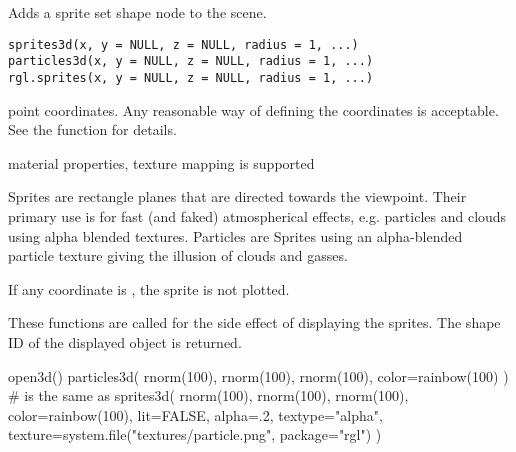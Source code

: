 \documentclass{article}
\begin{document}
\begin{Description}\relax
Adds a sprite set shape node to the scene.
\end{Description}
\begin{Usage}
\begin{verbatim}
sprites3d(x, y = NULL, z = NULL, radius = 1, ...)
particles3d(x, y = NULL, z = NULL, radius = 1, ...)
rgl.sprites(x, y = NULL, z = NULL, radius = 1, ...)
\end{verbatim}
\end{Usage}
\begin{Arguments}
\begin{ldescription}
\item[\code{ x, y, z }] point coordinates.  Any reasonable way of defining the
coordinates is acceptable.  See the function 
for details.
\item[\code{ radius }] 
\item[\code{ ... }] material properties, texture mapping is supported
\end{ldescription}
\end{Arguments}
\begin{Details}\relax
Sprites are rectangle planes that are directed towards the viewpoint.
Their primary use is for fast (and faked) atmospherical effects, e.g. particles and clouds
using alpha blended textures.
Particles are Sprites using an alpha-blended particle texture giving
the illusion of clouds and gasses.

If any coordinate is , the sprite is not plotted.
\end{Details}
\begin{Value}
These functions are called for the side effect of displaying the sprites.
The shape ID of the displayed object is returned.
\end{Value}
\begin{SeeAlso}\relax
{}
\end{SeeAlso}
\begin{Examples}
\begin{ExampleCode}
open3d()
particles3d( rnorm(100), rnorm(100), rnorm(100), color=rainbow(100) )
# is the same as
sprites3d( rnorm(100), rnorm(100), rnorm(100), color=rainbow(100),
  lit=FALSE, alpha=.2,
  textype="alpha", texture=system.file("textures/particle.png", package="rgl") )
\end{ExampleCode}
\end{Examples}
\end{document}
